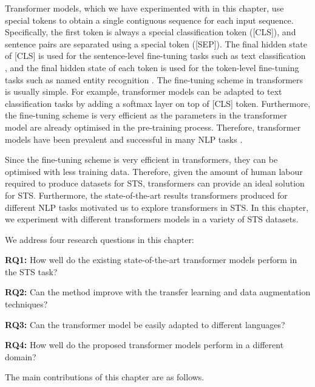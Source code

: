 Transformer models, which we have experimented with in this chapter, use special tokens to obtain a single contiguous sequence for each input sequence. Specifically, the first token is always a special classification token (\textsc{[CLS]}), and sentence pairs are separated using a special token (\textsc{[SEP]}). The final hidden state of \textsc{[CLS]}  is used for the sentence-level fine-tuning tasks such as text classification \autocite{10.1007/978-3-030-32381-3_16, ranasinghe-hettiarachchi-2020-brums}, and the final hidden state of each token is used for the token-level fine-tuning tasks such as named entity recognition \autocite{taher-etal-2019-beheshti, ranasinghe-etal-2021-wlv,jia-etal-2020-entity}. The fine-tuning scheme in transformers is usually simple. For example, transformer models can be adapted to text classification tasks by adding a softmax layer on top of \textsc{[CLS]} token. Furthermore, the fine-tuning scheme is very efficient as the parameters in the transformer model are already optimised in the pre-training process. Therefore, transformer models have been prevalent and successful in many NLP tasks \autocite{devlin-etal-2019-bert}. 

Since the fine-tuning scheme is very efficient in transformers, they can be optimised with less training data. Therefore, given the amount of human labour required to produce datasets for STS, transformers can provide an ideal solution for STS. Furthermore, the state-of-the-art results transformers produced for different NLP tasks motivated us to explore transformers in STS. In this chapter, we experiment with different transformers models in a variety of STS datasets.
 
We address four research questions in this chapter:

\textbf{RQ1:} How well do the existing state-of-the-art transformer models perform in the STS task? 

\textbf{RQ2:} Can the method improve with the transfer learning and data augmentation techniques?

\textbf{RQ3:} Can the transformer model be easily adapted to different languages?

\textbf{RQ4:} How well do the proposed transformer models perform in a different domain? 

The main contributions of this chapter are as follows.

